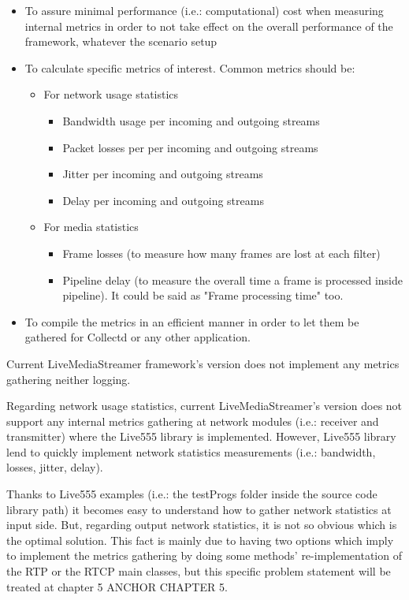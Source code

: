 \begin{itemize}
	\item To assure minimal performance (i.e.: computational) cost when measuring internal metrics in order to not take effect on the overall performance of the framework, whatever the scenario setup
	\item To calculate specific metrics of interest. Common metrics should be:
	\begin{itemize}
		\item For network usage statistics
		\begin{itemize}
			\item Bandwidth usage per incoming and outgoing streams
			\item Packet losses per per incoming and outgoing streams
			\item Jitter per incoming and outgoing streams
			\item Delay per incoming and outgoing streams
		\end{itemize}
		\item For media statistics
		\begin{itemize}
			\item Frame losses (to measure how many frames are lost at each filter)
			\item Pipeline delay (to measure the overall time a frame is processed inside pipeline). It could be said as "Frame processing time" too. 
		\end{itemize}
	\end{itemize}
	\item To compile the metrics in an efficient manner in order to let them be gathered for Collectd or any other application.
\end{itemize}

Current LiveMediaStreamer framework's version does not implement any metrics gathering neither logging.

Regarding network usage statistics, current LiveMediaStreamer's version does not support any internal metrics gathering at network modules (i.e.: receiver and transmitter) where the Live555 library is implemented. However, Live555 library lend to quickly implement network statistics measurements (i.e.: bandwidth, losses, jitter, delay). 

Thanks to Live555 examples (i.e.: the testProgs folder inside the source code library path) it becomes easy to understand how to gather network statistics at input side. But, regarding output network statistics, it is not so obvious which is the optimal solution. This fact is mainly due to having two options which imply to implement the metrics gathering by doing some methods' re-implementation of the RTP or the RTCP main classes, but this specific problem statement will be treated at chapter 5 ANCHOR CHAPTER 5.

